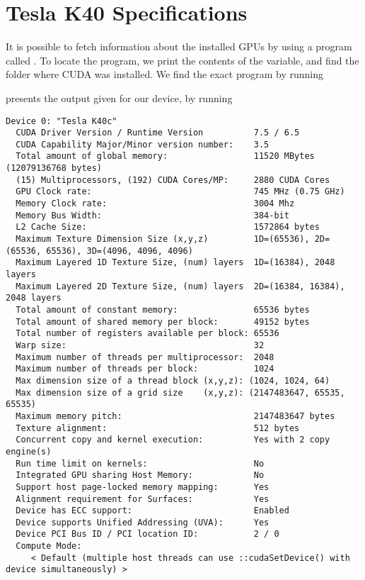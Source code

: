 \chapter{Tesla K40 Specifications}
\label{ap:tesla k40 specifications}

It is possible to fetch information about the installed GPUs by using a program called .
To locate the program, we print the contents of the  variable, and find the folder where CUDA was installed.
We find the exact program by running

\begin{quote}
\end{quote}

 presents the output given for our device, by running

\begin{quote}
\end{quote}

\begin{lstlisting}[numbers=none, caption={Information on the Tesla K40 GPU}, label={lst:tesla k40}]
Device 0: "Tesla K40c"
  CUDA Driver Version / Runtime Version          7.5 / 6.5
  CUDA Capability Major/Minor version number:    3.5
  Total amount of global memory:                 11520 MBytes (12079136768 bytes)
  (15) Multiprocessors, (192) CUDA Cores/MP:     2880 CUDA Cores
  GPU Clock rate:                                745 MHz (0.75 GHz)
  Memory Clock rate:                             3004 Mhz
  Memory Bus Width:                              384-bit
  L2 Cache Size:                                 1572864 bytes
  Maximum Texture Dimension Size (x,y,z)         1D=(65536), 2D=(65536, 65536), 3D=(4096, 4096, 4096)
  Maximum Layered 1D Texture Size, (num) layers  1D=(16384), 2048 layers
  Maximum Layered 2D Texture Size, (num) layers  2D=(16384, 16384), 2048 layers
  Total amount of constant memory:               65536 bytes
  Total amount of shared memory per block:       49152 bytes
  Total number of registers available per block: 65536
  Warp size:                                     32
  Maximum number of threads per multiprocessor:  2048
  Maximum number of threads per block:           1024
  Max dimension size of a thread block (x,y,z): (1024, 1024, 64)
  Max dimension size of a grid size    (x,y,z): (2147483647, 65535, 65535)
  Maximum memory pitch:                          2147483647 bytes
  Texture alignment:                             512 bytes
  Concurrent copy and kernel execution:          Yes with 2 copy engine(s)
  Run time limit on kernels:                     No
  Integrated GPU sharing Host Memory:            No
  Support host page-locked memory mapping:       Yes
  Alignment requirement for Surfaces:            Yes
  Device has ECC support:                        Enabled
  Device supports Unified Addressing (UVA):      Yes
  Device PCI Bus ID / PCI location ID:           2 / 0
  Compute Mode:
     < Default (multiple host threads can use ::cudaSetDevice() with device simultaneously) >
\end{lstlisting}

